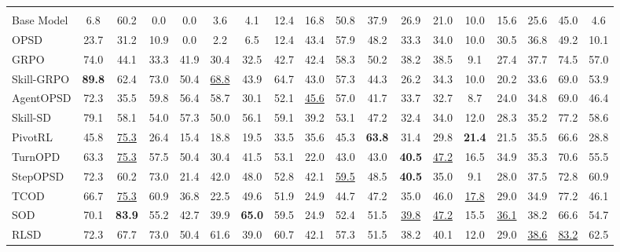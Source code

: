 \documentclass[10pt, logo, onecolumn, copyright]{nv}
\begin{document}
\begin{table}[t]
{\begin{tabular}{l@{\hspace{7pt}} ccccccc cccccccc cc}
\rowcolor{gray!15}\multicolumn{18}{l}{\textit{Qwen3-1.7B}} \\
Base Model
 & 6.8 & 60.2 & 0.0 & 0.0 & 3.6 & 4.1 & 12.4 & 16.8 & 50.8 & 37.9 & 26.9 & 21.0 & 10.0 & 15.6 & 25.6 & 45.0 & 4.6 \\
OPSD
 & 23.7 & 31.2 & 10.9 & 0.0 & 2.2 & 6.5 & 12.4 & 43.4 & 57.9 & 48.2 & 33.3 & 34.0 & 10.0 & 30.5 & 36.8 & 49.2 & 10.1 \\
GRPO
 & 74.0 & 44.1 & 33.3 & 41.9 & 30.4 & 32.5 & 42.7 & 42.4 & 58.3 & 50.2 & 38.2 & 38.5 & 9.1 & 27.4 & 37.7 & 74.5 & 57.0 \\
Skill-GRPO
 & \cellcolor{cellbest}\textbf{89.8} & 62.4 & 73.0 & 50.4 & \cellcolor{cellsecond}\underline{68.8} & 43.9 & 64.7 & 43.0 & 57.3 & 44.3 & 26.2 & 34.3 & 10.0 & 20.2 & 33.6 & 69.0 & 53.9 \\
AgentOPSD
 & 72.3 & 35.5 & 59.8 & 56.4 & 58.7 & 30.1 & 52.1 & \cellcolor{cellsecond}\underline{45.6} & 57.0 & 41.7 & 33.7 & 32.7 & 8.7 & 24.0 & 34.8 & 69.0 & 46.4 \\
Skill-SD
 & 79.1 & 58.1 & 54.0 & 57.3 & 50.0 & 56.1 & 59.1 & 39.2 & 53.1 & 47.2 & 32.4 & 34.0 & 12.0 & 28.3 & 35.2 & 77.2 & 58.6 \\
PivotRL
 & 45.8 & \cellcolor{cellsecond}\underline{75.3} & 26.4 & 15.4 & 18.8 & 19.5 & 33.5 & 35.6 & 45.3 & \cellcolor{cellbest}\textbf{63.8} & 31.4 & 29.8 & \cellcolor{cellbest}\textbf{21.4} & 21.5 & 35.5 & 66.6 & 28.8 \\
TurnOPD
 & 63.3 & \cellcolor{cellsecond}\underline{75.3} & 57.5 & 50.4 & 30.4 & 41.5 & 53.1 & 22.0 & 43.0 & 43.0 & \cellcolor{cellbest}\textbf{40.5} & \cellcolor{cellsecond}\underline{47.2} & 16.5 & 34.9 & 35.3 & 70.6 & 55.5 \\
StepOPSD
 & 72.3 & 60.2 & 73.0 & 21.4 & 42.0 & 48.0 & 52.8 & 42.1 & \cellcolor{cellsecond}\underline{59.5} & 48.5 & \cellcolor{cellbest}\textbf{40.5} & 35.0 & 9.1 & 28.0 & 37.5 & 72.8 & 60.9 \\
TCOD
 & 66.7 & \cellcolor{cellsecond}\underline{75.3} & 60.9 & 36.8 & 22.5 & 49.6 & 51.9 & 24.9 & 44.7 & 47.2 & 35.0 & 46.0 & \cellcolor{cellsecond}\underline{17.8} & 29.0 & 34.9 & 77.2 & 46.1 \\
SOD
 & 70.1 & \cellcolor{cellbest}\textbf{83.9} & 55.2 & 42.7 & 39.9 & \cellcolor{cellbest}\textbf{65.0} & 59.5 & 24.9 & 52.4 & 51.5 & \cellcolor{cellsecond}\underline{39.8} & \cellcolor{cellsecond}\underline{47.2} & 15.5 & \cellcolor{cellsecond}\underline{36.1} & 38.2 & 66.6 & 54.7 \\
RLSD
 & 72.3 & 67.7 & 73.0 & 50.4 & 61.6 & 39.0 & 60.7 & 42.1 & 57.3 & 51.5 & 38.2 & 40.1 & 12.0 & 29.0 & \cellcolor{cellsecond}\underline{38.6} & \cellcolor{cellsecond}\underline{83.2} & 62.5 \\

\end{tabular}}
\end{table}
\end{document}
